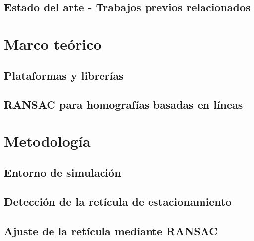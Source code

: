 \documentclass[10pt,letterpaper,final]{article}
\begin{document}
\subsection{Estado del arte - Trabajos previos relacionados}


% 

\clearpage
\section{Marco teórico}\label{chap:marco-teorico}


\subsection{Plataformas y librerías}\label{sec:plataformas}


\subsection{RANSAC para homografías basadas en líneas}\label{sec:ransac-teorico}


\clearpage
\section{Metodología}\label{chap:metodologia}


\subsection{Entorno de simulación}\label{sec:carla}


\subsection{Detección de la retícula de estacionamiento}\label{sec:metodo-reticula}


\subsection{Ajuste de la retícula mediante RANSAC}\label{sec:metodo-ransac}

\end{document}
